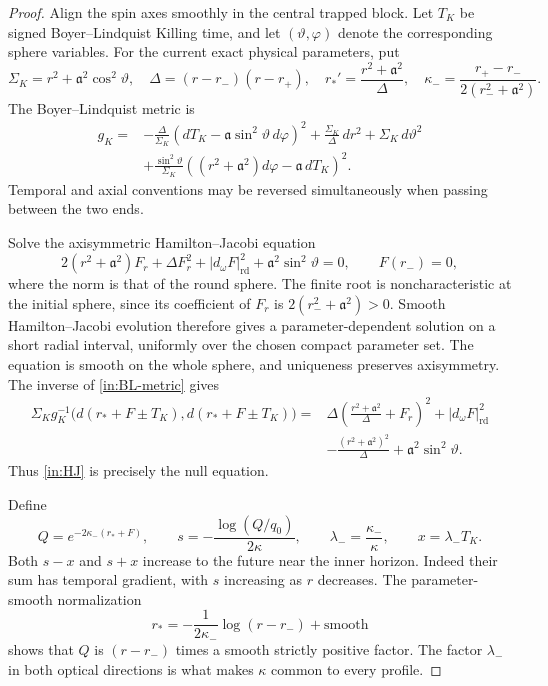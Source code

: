 \begin{proof}
Align the spin axes smoothly in the central trapped
block. Let $T_K$ be signed Boyer--Lindquist Killing time, and let
$(\vartheta,\varphi)$ denote the corresponding sphere variables.
For the current exact physical parameters, put
\[
 \Sigma_K=r^2+\mathfrak a^2\cos^2\vartheta,\quad
 \Delta=(r-r_-)(r-r_+),\quad
 r_*'=\frac{r^2+\mathfrak a^2}{\Delta},\quad
 \kappa_-=\frac{r_+-r_-}{2(r_-^2+\mathfrak a^2)}.
\]
The Boyer--Lindquist metric is
\begin{equation}\label{in:BL-metric}
\begin{split}
 g_K={}&-\frac{\Delta}{\Sigma_K}
        (dT_K-\mathfrak a\sin^2\vartheta\,d\varphi)^2
       +\frac{\Sigma_K}{\Delta}\,dr^2+\Sigma_K\,d\vartheta^2\\
 &+\frac{\sin^2\vartheta}{\Sigma_K}
        ((r^2+\mathfrak a^2)d\varphi-\mathfrak a\,dT_K)^2.
\end{split}
\end{equation}
Temporal and axial conventions may be reversed simultaneously when
passing between the two ends.

Solve the axisymmetric Hamilton--Jacobi equation
\begin{equation}\label{in:HJ}
 2(r^2+\mathfrak a^2)F_r+\Delta F_r^2
       +|d_\omega F|_{\mathrm{rd}}^2
       +\mathfrak a^2\sin^2\vartheta=0,
 \qquad F(r_-)=0,
\end{equation}
where the norm is that of the round sphere. The finite root is
noncharacteristic at the initial sphere, since its coefficient of
$F_r$ is $2(r_-^2+\mathfrak a^2)>0$. Smooth Hamilton--Jacobi evolution
therefore gives a parameter-dependent solution on a short radial
interval, uniformly over the chosen compact parameter set. The equation
is smooth on the whole sphere, and uniqueness preserves axisymmetry.
The inverse of \eqref{in:BL-metric} gives
\[
\begin{split}
 \Sigma_K g_K^{-1}
  \bigl(d(r_*+F\pm T_K),d(r_*+F\pm T_K)\bigr)
 ={}&\Delta\left(\frac{r^2+\mathfrak a^2}{\Delta}+F_r\right)^2
       +|d_\omega F|_{\mathrm{rd}}^2\\
 &-\frac{(r^2+\mathfrak a^2)^2}{\Delta}
       +\mathfrak a^2\sin^2\vartheta.
\end{split}
\]
Thus \eqref{in:HJ} is precisely the null equation.

Define
\begin{equation}\label{in:exact-coordinates}
 Q=e^{-2\kappa_-(r_*+F)},\qquad
 s=-\frac{\log(Q/q_0)}{2\kappa},\qquad
 \lambda_- =\frac{\kappa_-}{\kappa},\qquad
 x=\lambda_-T_K.
\end{equation}
Both $s-x$ and $s+x$ increase to the future near the inner horizon.
Indeed their sum has temporal gradient, with $s$ increasing as $r$
decreases. The parameter-smooth normalization
\[
 r_*=-\frac{1}{2\kappa_-}\log(r-r_-)+\text{smooth}
\]
shows that $Q$ is $(r-r_-)$ times a smooth strictly positive factor.
The factor $\lambda_-$ in both optical directions is what makes
$\kappa$ common to every profile.


\end{proof}
